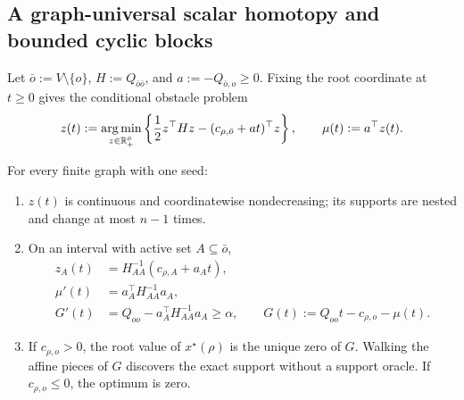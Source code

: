 \subsection{A graph-universal scalar homotopy and bounded cyclic blocks}
\label{subsec:graph-homotopy}

Let $\bar o:=V\setminus\{o\}$,
$H:=Q_{\bar o\bar o}$, and
$a:=-Q_{\bar o,o}\geq0$.  Fixing the root coordinate at $t\geq0$ gives the
conditional obstacle problem
\begin{equation}
 z(t)
 :=\operatorname*{arg\,min}_{z\in\mathbb R_+^{\bar o}}
 \left\{
  \frac12z^\top Hz-(c_{\rho,\bar o}+at)^\top z
 \right\},
 \qquad
 \mu(t):=a^\top z(t).
 \label{eq:graph-conditional-response}
\end{equation}

\begin{theorem}
\label{thm:graph-scalar-homotopy}
For every finite graph with one seed:
\begin{enumerate}[label=(\roman*),leftmargin=*]
 \item $z(t)$ is continuous and coordinatewise nondecreasing; its supports
 are nested and change at most $n-1$ times.
 \item On an interval with active set $A\subseteq\bar o$,
 \begin{align}
  z_A(t)&=H_{AA}^{-1}(c_{\rho,A}+a_At),
  \label{eq:graph-homotopy-affine}\\
  \mu'(t)&=a_A^\top H_{AA}^{-1}a_A,
  \label{eq:graph-homotopy-response-slope}\\
  G'(t)&=Q_{oo}-a_A^\top H_{AA}^{-1}a_A\geq\alpha,
  \qquad
  G(t):=Q_{oo}t-c_{\rho,o}-\mu(t).
  \label{eq:graph-root-schur-slope}
 \end{align}
 \item If $c_{\rho,o}>0$, the root value of $x^\star(\rho)$ is the unique
 zero of $G$.  Walking the affine pieces of $G$ discovers the exact support
 without a support oracle.  If $c_{\rho,o}\leq0$, the optimum is zero.
\end{enumerate}
\end{theorem}

